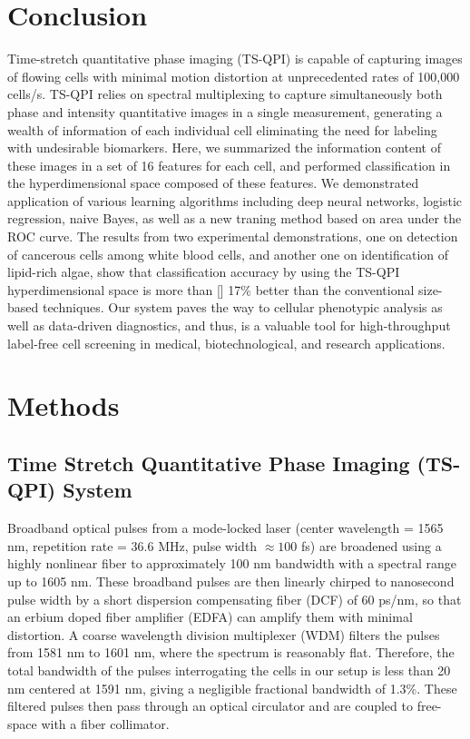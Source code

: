 \documentclass[aps,pra,reprint,longbibliography,superscriptaddress]{revtex4-1}
\begin{document}
\section{Conclusion}

Time-stretch quantitative phase imaging (TS-QPI) is capable of capturing images of flowing cells with minimal motion distortion at unprecedented rates of 100,000 cells/s. TS-QPI relies on spectral multiplexing to capture simultaneously both phase and intensity quantitative images in a single measurement, generating a wealth of information of each individual cell eliminating the need for labeling with undesirable biomarkers. Here, we summarized the information content of these images in a set of 16 features for each cell, and performed classification in the hyperdimensional space composed of these features. We demonstrated application of various learning algorithms including deep neural networks, logistic regression, naive Bayes, as well as a new traning method based on area under the ROC curve. The results from two experimental demonstrations, one on detection of cancerous cells among white blood cells, and another one on identification of lipid-rich algae, show that classification accuracy by using the TS-QPI hyperdimensional space is more than [] 17\% better than the conventional size-based techniques. Our system paves the way to cellular phenotypic analysis as well as data-driven diagnostics, and thus, is a valuable tool for high-throughput label-free cell screening in medical, biotechnological, and research applications.

\section{\label{scn:Methods} Methods}

\subsection{Time Stretch Quantitative Phase Imaging (TS-QPI) System}

Broadband optical pulses from a mode-locked laser (center wavelength = 1565 nm, repetition rate = 36.6 MHz, pulse width $\approx100$ fs) are broadened using a highly nonlinear fiber to approximately 100 nm bandwidth with a spectral range up to 1605 nm. These broadband pulses are then linearly chirped to nanosecond pulse width by a short dispersion compensating fiber (DCF) of 60 ps/nm, so that an erbium doped fiber amplifier (EDFA) can amplify them with minimal distortion. A coarse wavelength division multiplexer (WDM) filters the pulses from 1581 nm to 1601 nm, where the spectrum is reasonably flat. Therefore, the total bandwidth of the pulses interrogating the cells in our setup is less than 20 nm centered at 1591 nm, giving a negligible fractional bandwidth of 1.3\%. These filtered pulses then pass through an optical circulator and are coupled to free-space with a fiber collimator.
\end{document}
